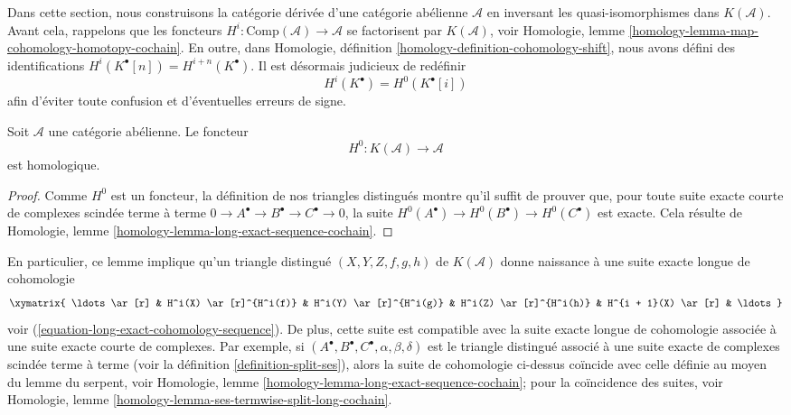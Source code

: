 \noindent
Dans cette section, nous construisons la catégorie dérivée d'une catégorie
abélienne $\mathcal{A}$ en inversant les quasi-isomorphismes dans
$K(\mathcal{A})$. Avant cela, rappelons que les foncteurs
$H^i : \text{Comp}(\mathcal{A}) \to \mathcal{A}$ se factorisent par
$K(\mathcal{A})$, voir Homologie, lemme
\ref{homology-lemma-map-cohomology-homotopy-cochain}. En outre, dans Homologie,
définition \ref{homology-definition-cohomology-shift}, nous avons défini des
identifications $H^i(K^\bullet[n]) = H^{i + n}(K^\bullet)$. Il est désormais
judicieux de redéfinir
$$
H^i(K^\bullet) = H^0(K^\bullet[i])
$$
afin d'éviter toute confusion et d'éventuelles erreurs de signe.

\begin{lemma}
\label{lemma-cohomology-homological}
Soit $\mathcal{A}$ une catégorie abélienne. Le foncteur
$$
H^0 : K(\mathcal{A}) \longrightarrow \mathcal{A}
$$
est homologique.
\end{lemma}

\begin{proof}
Comme $H^0$ est un foncteur, la définition de nos triangles distingués montre
qu'il suffit de prouver que, pour toute suite exacte courte de complexes
scindée terme à terme
$0 \to A^\bullet \to B^\bullet \to C^\bullet \to 0$, la suite
$H^0(A^\bullet) \to H^0(B^\bullet) \to H^0(C^\bullet)$ est exacte. Cela
résulte de Homologie, lemme
\ref{homology-lemma-long-exact-sequence-cochain}.
\end{proof}

\noindent
En particulier, ce lemme implique qu'un triangle distingué
$(X, Y, Z, f, g, h)$ de $K(\mathcal{A})$ donne naissance à une suite exacte
longue de cohomologie
\begin{equation}
\label{equation-long-exact-cohomology-sequence-D}
\xymatrix{
\ldots \ar[r] &
H^i(X) \ar[r]^{H^i(f)} &
H^i(Y) \ar[r]^{H^i(g)} &
H^i(Z) \ar[r]^{H^i(h)} &
H^{i + 1}(X) \ar[r] & \ldots
}
\end{equation}
voir (\ref{equation-long-exact-cohomology-sequence}). De plus, cette suite est
compatible avec la suite exacte longue de cohomologie associée à une suite
exacte courte de complexes. Par exemple, si
$(A^\bullet, B^\bullet, C^\bullet, \alpha, \beta, \delta)$ est le triangle
distingué associé à une suite exacte de complexes scindée terme à terme (voir
la définition \ref{definition-split-ses}), alors la suite de cohomologie
ci-dessus coïncide avec celle définie au moyen du lemme du serpent, voir
Homologie, lemme \ref{homology-lemma-long-exact-sequence-cochain}; pour la
coïncidence des suites, voir Homologie, lemme
\ref{homology-lemma-ses-termwise-split-long-cochain}.

